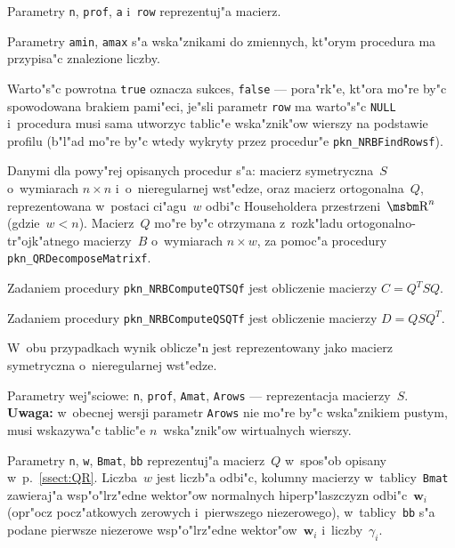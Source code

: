 Parametry \texttt{n}, \texttt{prof}, \texttt{a} i~\texttt{row} reprezentuj"a
macierz.

Parametry \texttt{amin}, \texttt{amax} s"a wska"znikami do zmiennych,
kt"orym procedura ma przypisa"c znalezione liczby.

Warto"s"c powrotna \texttt{true} oznacza sukces, \texttt{false} ---
pora"rk"e, kt"ora mo"re by"c spowodowana brakiem pami"eci, je"sli
parametr \texttt{row} ma warto"s"c \texttt{NULL} i~procedura
musi sama utworzyc tablic"e wska"znik"ow wierszy na podstawie profilu
(b"l"ad mo"re by"c wtedy wykryty przez procedur"e
\texttt{pkn\_NRBFindRowsf}).

\vspace{\bigskipamount}
Danymi dla powy"rej opisanych procedur s"a: macierz symetryczna~$S$
o~wymiarach $n\times n$ i~o~nieregularnej wst"edze, oraz macierz
ortogonalna~$Q$, reprezentowana w~postaci ci"agu~$w$ odbi"c Householdera
przestrzeni~$\R^n$ (gdzie~$w<n$). Macierz~$Q$ mo"re by"c otrzymana
z~rozk"ladu ortogonalno-tr"ojk"atnego macierzy~$B$ o~wymiarach $n\times w$,
za pomoc"a procedury \texttt{pkn\_QRDecomposeMatrixf}.

Zadaniem procedury \texttt{pkn\_NRBComputeQTSQf} jest obliczenie macierzy
$C=Q^TSQ$.

Zadaniem procedury \texttt{pkn\_NRBComputeQSQTf} jest obliczenie macierzy
$D=QSQ^T$.

W~obu przypadkach wynik oblicze"n jest reprezentowany jako macierz
sy\-met\-rycz\-na o~nieregularnej wst"edze.

Parametry wej"sciowe: \texttt{n}, \texttt{prof}, \texttt{Amat},
\texttt{Arows} --- reprezentacja macierzy~$S$. \\
\textbf{Uwaga:} w~obecnej wersji parametr \texttt{Arows} nie mo"re by"c
wska"znikiem pustym, musi wskazywa"c tablic"e $n$~wska"znik"ow wirtualnych
wierszy.

Parametry \texttt{n}, \texttt{w}, \texttt{Bmat}, \texttt{bb} reprezentuj"a
macierz~$Q$ w~spos"ob opisany w~p.~\ref{ssect:QR}. Liczba~$w$ jest liczb"a
odbi"c, kolumny macierzy w~tablicy~\texttt{Bmat} zawieraj"a wsp"o"lrz"edne
wektor"ow normalnych hiperp"laszczyzn odbi"c~$\bm{w}_i$
(opr"ocz pocz"atkowych zerowych i~pierwszego niezerowego),
w~tablicy~\texttt{bb} s"a podane pierwsze niezerowe wsp"o"lrz"edne
wektor"ow~$\bm{w}_i$ i~liczby~$\gamma_i$.

